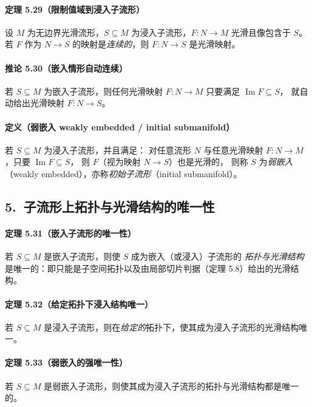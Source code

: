 \documentclass[11pt,a4paper]{article}
\begin{document}
\paragraph{定理 5.29（限制值域到浸入子流形）}
设 $M$ 为无边界光滑流形，$S\subseteq M$ 为浸入子流形，$F:N\to M$ 光滑且像包含于 $S$。
若 $F$ 作为 $N\to S$ 的映射是\emph{连续的}，则 $F:N\to S$ 是光滑映射。

\paragraph{推论 5.30（嵌入情形自动连续）}
若 $S\subseteq M$ 为嵌入子流形，则任何光滑映射 $F:N\to M$ 只要满足 $\operatorname{Im}F\subseteq S$，
就自动给出光滑映射 $F:N\to S$。

\paragraph{定义（弱嵌入 weakly embedded / initial submanifold）}
若 $S\subseteq M$ 为浸入子流形，并且满足：
对任意流形 $N$ 与任意光滑映射 $F:N\to M$，只要 $\operatorname{Im}F\subseteq S$，
则 $F$（视为映射 $N\to S$）也是光滑的，
则称 $S$ 为\emph{弱嵌入}（weakly embedded），亦称\emph{初始子流形}（initial submanifold）。

\subsection*{5.\ 子流形上拓扑与光滑结构的唯一性}

\paragraph{定理 5.31（嵌入子流形的唯一性）}
若 $S\subseteq M$ 是嵌入子流形，则使 $S$ 成为嵌入（或浸入）子流形的
\emph{拓扑与光滑结构}是唯一的：即只能是子空间拓扑以及由局部切片判据（定理 5.8）给出的光滑结构。

\paragraph{定理 5.32（给定拓扑下浸入结构唯一）}
若 $S\subseteq M$ 是浸入子流形，则在\emph{给定的}拓扑下，使其成为浸入子流形的光滑结构唯一。

\paragraph{定理 5.33（弱嵌入的强唯一性）}
若 $S\subseteq M$ 是弱嵌入子流形，则使其成为浸入子流形的拓扑与光滑结构都是唯一的。
\end{document}
